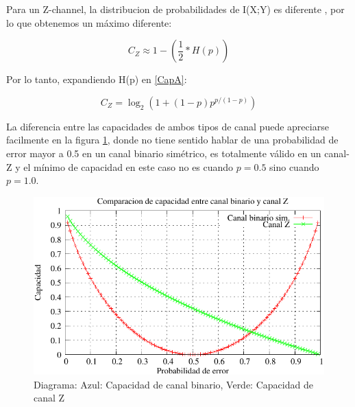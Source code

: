 Para un Z-channel, la distribucion de probabilidades de I(X;Y) es diferente \cite{Tallini:02}, por lo que obtenemos un máximo diferente:

\begin{equation}\label{CapA}
C_{Z} \approx 1 - \left(\frac{1}{2}*H(p)\right)
\end{equation}

Por lo tanto, expandiendo H(p) en \ref{CapA}:

$$ C_{Z} = \log_2\left(1+(1-p) p^{p/(1-p)}\right) $$

La diferencia entre las capacidades de ambos tipos de canal puede apreciarse facilmente en la figura \ref{fig:CompBZ}, donde no tiene sentido hablar de una probabilidad de error mayor a 0.5 en un canal binario simétrico, es totalmente válido en un canal-Z y el mínimo de capacidad en este caso no es cuando $p=0.5$ sino cuando $p=1.0$.

\begin{figure}[th]
  \begin{center}
    \includegraphics[scale=0.9]{capacidad/comparacionBZ}
  \end{center}
  \caption{Diagrama: Azul: Capacidad de canal binario, Verde: Capacidad de canal Z}
  \label{fig:CompBZ}
\end{figure}


